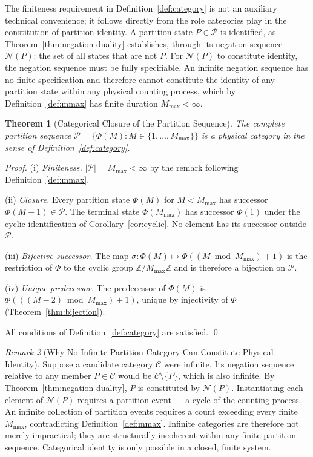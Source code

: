 \documentclass[twocolumn,10pt,a4paper]{article}
\theoremstyle{thmstyle}
\newtheorem{theorem}{Theorem}[section]
\theoremstyle{definition}
\theoremstyle{remark}
\newtheorem{remark}[theorem]{Remark}
\newcommand{\Parts}{\mathcal{P}}
\newcommand{\Mmax}{M_{\max}}
\newcommand{\PhiMap}{\varPhi}
\begin{document}
The finiteness requirement in Definition~\ref{def:category} is not an auxiliary technical convenience; it follows directly from the role categories play in the constitution of partition identity. A partition state $P \in \Parts$ is identified, as Theorem~\ref{thm:negation-duality} establishes, through its negation sequence $\mathcal{N}(P)$: the set of all states that are not $P$. For $\mathcal{N}(P)$ to constitute identity, the negation sequence must be fully specifiable. An infinite negation sequence has no finite specification and therefore cannot constitute the identity of any partition state within any physical counting process, which by Definition~\ref{def:mmax} has finite duration $\Mmax < \infty$.

\begin{theorem}[Categorical Closure of the Partition Sequence]
\label{thm:cat-closure}
The complete partition sequence $\Parts = \{ \PhiMap(M) : M \in \{1, \ldots, \Mmax\} \}$ is a physical category in the sense of Definition~\ref{def:category}.
\end{theorem}

\begin{proof}
(i) \emph{Finiteness.} $|\Parts| = \Mmax < \infty$ by the remark following Definition~\ref{def:mmax}.

(ii) \emph{Closure.} Every partition state $\PhiMap(M)$ for $M < \Mmax$ has successor $\PhiMap(M+1) \in \Parts$. The terminal state $\PhiMap(\Mmax)$ has successor $\PhiMap(1)$ under the cyclic identification of Corollary~\ref{cor:cyclic}. No element has its successor outside $\Parts$.

(iii) \emph{Bijective successor.} The map $\sigma\colon \PhiMap(M) \mapsto \PhiMap\!\left((M \bmod \Mmax) + 1\right)$ is the restriction of $\PhiMap$ to the cyclic group $\mathbb{Z}/\Mmax\mathbb{Z}$ and is therefore a bijection on $\Parts$.

(iv) \emph{Unique predecessor.} The predecessor of $\PhiMap(M)$ is $\PhiMap\!\left(((M-2) \bmod \Mmax) + 1\right)$, unique by injectivity of $\PhiMap$ (Theorem~\ref{thm:bijection}).

All conditions of Definition~\ref{def:category} are satisfied. \qed
\end{proof}

\begin{remark}[Why No Infinite Partition Category Can Constitute Physical Identity]
\label{rem:infinite-cat}
Suppose a candidate category $\mathcal{C}$ were infinite. Its negation sequence relative to any member $P \in \mathcal{C}$ would be $\mathcal{C} \setminus \{P\}$, which is also infinite. By Theorem~\ref{thm:negation-duality}, $P$ is constituted by $\mathcal{N}(P)$. Instantiating each element of $\mathcal{N}(P)$ requires a partition event --- a cycle of the counting process. An infinite collection of partition events requires a count exceeding every finite $\Mmax$, contradicting Definition~\ref{def:mmax}. Infinite categories are therefore not merely impractical; they are structurally incoherent within any finite partition sequence. Categorical identity is only possible in a closed, finite system.
\end{remark}
\end{document}
